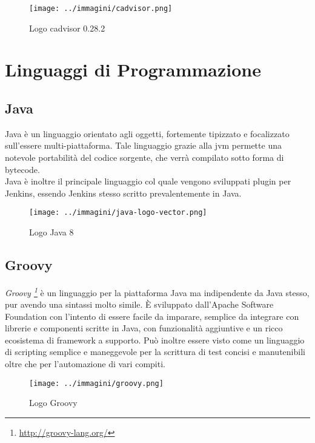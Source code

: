 \begin{figure}[H]
    \capstart
    \centering
    \texttt{[image: ../immagini/cadvisor.png]}
    \caption{Logo cadvisor 0.28.2}
\end{figure}

\section{Linguaggi di Programmazione}
\newpage
\subsection{Java}

Java è un linguaggio orientato agli oggetti, fortemente tipizzato e focalizzato sull'essere multi-piattaforma. Tale linguaggio grazie alla \gls{jvm} permette una notevole portabilità del codice sorgente, che verrà compilato sotto forma di \gls{bytecode}. \\

Java è inoltre il principale linguaggio col quale vengono sviluppati \gls{plugin} per Jenkins, essendo Jenkins stesso scritto prevalentemente in Java.

\begin{figure}[H]
    \capstart
    \centering
    \texttt{[image: ../immagini/java-logo-vector.png]}
    \caption{Logo Java 8}
\end{figure}

\subsection{Groovy}

\textit{Groovy \footnote{\url{http://groovy-lang.org/}}} è un linguaggio per la piattaforma Java ma indipendente da Java stesso, pur avendo una sintassi molto simile. \`E sviluppato dall'Apache Software Foundation con l'intento di essere facile da imparare, semplice da integrare con librerie e componenti scritte in Java, con funzionalità aggiuntive e un ricco ecosistema di framework a supporto. Può inoltre essere visto come un linguaggio di scripting semplice e maneggevole per la scrittura di test concisi e manutenibili oltre che per l'automazione di vari compiti. 

\begin{figure}[H]
    \capstart
    \centering
    \texttt{[image: ../immagini/groovy.png]}
    \caption{Logo Groovy}
\end{figure}